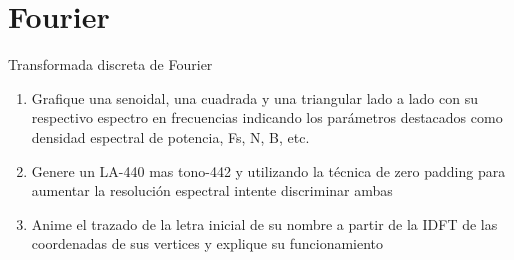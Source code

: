  \section{Fourier}
 \begin{frame}{Transformada discreta de Fourier}
    \begin{enumerate}
       \item{Grafique una senoidal, una cuadrada y una triangular lado a lado con su respectivo espectro en frecuencias indicando los parámetros destacados como densidad espectral de potencia, Fs, N, B, etc.}
       \item{Genere un LA-440 mas tono-442 y utilizando la técnica de zero padding para aumentar la resolución espectral intente discriminar ambas}
       \item{Anime el trazado de la letra inicial de su nombre a partir de la IDFT de las coordenadas de sus vertices y explique su funcionamiento}
    \end{enumerate}
 \end{frame}
